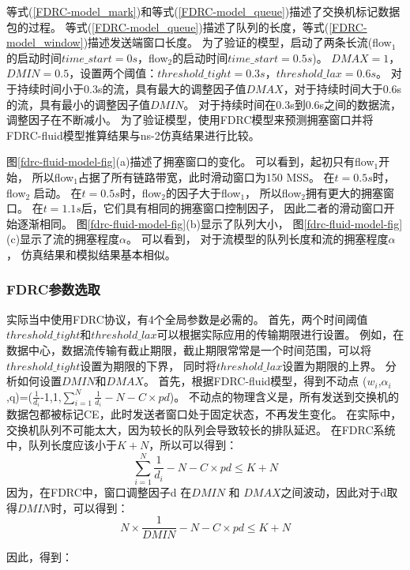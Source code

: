 等式(\ref{FDRC-model_mark})和等式(\ref{FDRC-model_queue})描述了交换机标记数据包的过程。
等式(\ref{FDRC-model_queue})描述了队列的长度，等式(\ref{FDRC-model_window})描述发送端窗口长度。
为了验证的模型，启动了两条长流(flow$_1$的启动时间$time\_start = 0s$，flow$_2$的启动时间$time\_start = 0.5s$)。
$DMAX = 1$，$DMIN = 0.5$，设置两个阈值：$threshold\_tight = 0.3s$，$threshold\_lax = 0.6s$。
对于持续时间小于0.3s的流，具有最大的调整因子值$DMAX$，对于持续时间大于0.6s的流，具有最小的调整因子值$DMIN$。
对于持续时间在0.3s到0.6s之间的数据流，调整因子在不断减小。
为了验证模型，使用FDRC模型来预测拥塞窗口并将FDRC-fluid模型推算结果与ns-2仿真结果进行比较。

图\ref{fdrc-fluid-model-fig}(a)描述了拥塞窗口的变化。
可以看到，起初只有flow$_1$开始，
所以flow$_1$占据了所有链路带宽，此时滑动窗口为150 MSS。
在$t = 0.5s$时，flow$_2$ 启动。
在$t = 0.5s$时，flow$_2$的因子大于flow$_1$，
所以flow$_2$拥有更大的拥塞窗口。
在$t = 1.1s$后，它们具有相同的拥塞窗口控制因子，
因此二者的滑动窗口开始逐渐相同。
图\ref{fdrc-fluid-model-fig}(b)显示了队列大小，
图\ref{fdrc-fluid-model-fig}(c)显示了流的拥塞程度$\alpha$。
可以看到，
对于流模型的队列长度和流的拥塞程度$\alpha$，
仿真结果和模拟结果基本相似。


\subsubsection{FDRC参数选取}
实际当中使用FDRC协议，有4个全局参数是必需的。
首先，两个时间阈值$threshold\_tight$和$threshold\_lax$可以根据实际应用的传输期限进行设置。
例如，在数据中心，数据流传输有截止期限，截止期限常常是一个时间范围，可以将$threshold\_tight$设置为期限的下界，
同时将$threshold\_lax$设置为期限的上界。
分析如何设置$DMIN$和$DMAX$。
首先，根据FDRC-fluid模型，得到不动点 ($w_i$,$\alpha_i$,q)=($\frac{1}{d_i}$-1,1,$\sum_{i=1}^N \frac{1}{d_i}-N-C\times pd$)。
不动点的物理含义是，所有发送到交换机的数据包都被标记CE，此时发送者窗口处于固定状态，不再发生变化。
在实际中，交换机队列不可能太大，因为较长的队列会导致较长的排队延迟。
在FDRC系统中，队列长度应该小于$K + N$，所以可以得到：
\begin{equation}
\label{queuelength}
\sum_{i=1}^N \frac{1}{d_i}-N-C\times pd \le K+N
\end{equation}
因为，在FDRC中，窗口调整因子d 在$DMIN$ 和 $DMAX$之间波动，因此对于d取得$DMIN$时，可以得到：
\begin{equation}
\label{DMAXvalue}
N \times \frac{1}{DMIN}-N-C\times pd \le K+N
\end{equation}

因此，得到：

